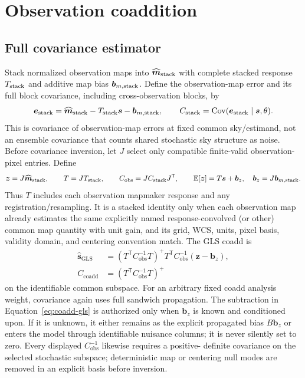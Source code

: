 \documentclass[11pt]{article}
\newcommand{\E}{\mathbb{E}}
\newcommand{\Cov}{\operatorname{Cov}}
\newcommand{\trans}{\mathsf{T}}
\begin{document}
\section{Observation coaddition}

\subsection{Full covariance estimator}

Stack normalized observation maps into \(\widehat{\boldsymbol m}_{\rm stack}\)
with complete stacked response \(T_{\rm stack}\) and additive map bias
\(\boldsymbol b_{m,\rm stack}\). Define the observation-map error and its full
block covariance, including cross-observation blocks, by
\begin{equation}
 \boldsymbol e_{\rm stack}=\widehat{\boldsymbol m}_{\rm stack}
 -T_{\rm stack}\boldsymbol s-\boldsymbol b_{m,\rm stack},\qquad
 C_{\rm stack}=\Cov(\boldsymbol e_{\rm stack}\mid
 \boldsymbol s,\theta).
 \label{eq:coadd-error-covariance}
\end{equation}
This is covariance of observation-map errors at fixed common sky/estimand, not
an ensemble covariance that counts shared stochastic sky structure as noise.
Before covariance inversion, let \(J\) select only compatible finite-valid
observation-pixel entries. Define
\begin{equation}
 \boldsymbol z=J\widehat{\boldsymbol m}_{\rm stack},\qquad
 T=JT_{\rm stack},\qquad
 C_{\mathrm{obs}}=JC_{\rm stack}J^\trans,
 \qquad \E[\boldsymbol z]=T\boldsymbol s+\boldsymbol b_z,
 \quad \boldsymbol b_z=J\boldsymbol b_{m,\rm stack}.
 \label{eq:selected-coadd-system}
\end{equation}
Thus \(T\) includes each observation mapmaker response and any
registration/resampling. It is a stacked identity only when each observation
map already estimates the same explicitly named response-convolved (or other)
common map quantity with unit gain, and its grid, WCS, units, pixel basis,
validity domain, and centering convention match. The GLS coadd is
\begin{align}
 \widehat{\boldsymbol s}_{\mathrm{GLS}}
 &= (T^\trans C_{\mathrm{obs}}^{-1}T)^{+}
 T^\trans C_{\mathrm{obs}}^{-1}(\boldsymbol z-\boldsymbol b_z),
 \label{eq:coadd-gls}\\
 C_{\mathrm{coadd}}
 &= (T^\trans C_{\mathrm{obs}}^{-1}T)^{+}
 \label{eq:coadd-gls-covariance}
\end{align}
on the identifiable common subspace. For an arbitrary fixed coadd analysis
weight, covariance again uses full sandwich propagation.
The subtraction in Equation~\eqref{eq:coadd-gls} is authorized only when
\(\boldsymbol b_z\) is known and conditioned upon. If it is unknown, it either
remains as the explicit propagated bias \(B\boldsymbol b_z\) or enters the
model through identifiable nuisance columns; it is never silently set to zero.
Every displayed \(C_{\mathrm{obs}}^{-1}\) likewise requires a positive-
definite covariance on the selected stochastic subspace; deterministic map or
centering null modes are removed in an explicit basis before inversion.
\end{document}
